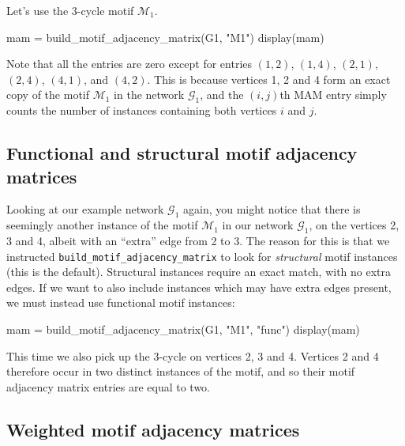 \documentclass{article}
\begin{document}
Let's use the 3-cycle motif $\mathcal{M}_1$.

\begin{tcolorbox}[colback=black!5!white,colframe=black!15!white]
\begin{juliablock}
mam = build_motif_adjacency_matrix(G1, "M1")
display(mam)
\end{juliablock}
\texttt{\obeylines\printpythontex}
\end{tcolorbox}

Note that all the entries are zero except for entries
$(1,2)$,
$(1,4)$,
$(2,1)$,
$(2,4)$,
$(4,1)$,
and
$(4,2)$.
This is because vertices 1, 2 and 4 form an exact copy of
the motif $\mathcal{M}_1$ in the network $\mathcal{G}_1$,
and the  $(i,j)$th MAM entry simply counts the number of instances
containing both vertices $i$ and $j$.

\subsection{Functional and structural motif adjacency matrices}

Looking at our example network $\mathcal{G}_1$ again,
you might notice that there is seemingly another instance
of the motif $\mathcal{M}_1$
in our network $\mathcal{G}_1$,
on the vertices 2, 3 and 4,
albeit with an ``extra'' edge from 2 to 3.
The reason for this is that we instructed
\texttt{build\_motif\_adjacency\_matrix}
to look for \emph{structural} motif instances (this is the default).
Structural instances require an exact match, with no extra edges.
If we want to also include instances which may have extra edges present,
we must instead use functional motif instances:

\begin{tcolorbox}[colback=black!5!white,colframe=black!15!white]
\begin{juliablock}
mam = build_motif_adjacency_matrix(G1, "M1", "func")
display(mam)
\end{juliablock}
\texttt{\obeylines\printpythontex}
\end{tcolorbox}

This time we also pick up the 3-cycle on vertices 2, 3 and 4.
Vertices 2 and 4 therefore occur in two distinct instances
of the motif, and so their motif adjacency matrix entries are equal
to two.

\subsection{Weighted motif adjacency matrices}
\end{document}
